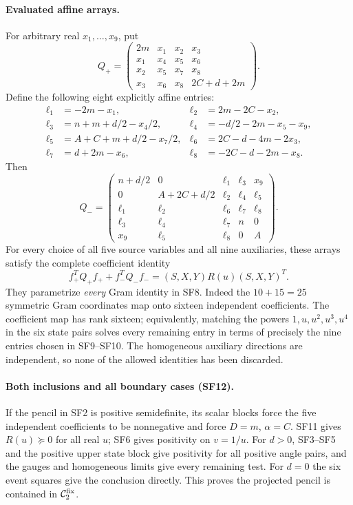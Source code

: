 \paragraph{Evaluated affine arrays.}
For arbitrary real $x_1,\ldots,x_9$, put
\[
Q_+=\begin{pmatrix}
2m&x_1&x_2&x_3\\
x_1&x_4&x_5&x_6\\
x_2&x_5&x_7&x_8\\
x_3&x_6&x_8&2C+d+2m
\end{pmatrix}.
\tag{SF9}
\]
Define the following eight explicitly affine entries:
\begin{align*}
\ell_1&=-2m-x_1,&\ell_2&=2m-2C-x_2,\\
\ell_3&=n+m+d/2-x_4/2,&\ell_4&=-d/2-2m-x_5-x_9,\\
\ell_5&=A+C+m+d/2-x_7/2,&\ell_6&=2C-d-4m-2x_3,\\
\ell_7&=d+2m-x_6,&\ell_8&=-2C-d-2m-x_8.
\end{align*}
Then
\[
Q_-=\begin{pmatrix}
n+d/2&0&\ell_1&\ell_3&x_9\\
0&A+2C+d/2&\ell_2&\ell_4&\ell_5\\
\ell_1&\ell_2&\ell_6&\ell_7&\ell_8\\
\ell_3&\ell_4&\ell_7&n&0\\
x_9&\ell_5&\ell_8&0&A
\end{pmatrix}.
\tag{SF10}
\]
For every choice of all five source variables and all nine auxiliaries,
these arrays satisfy the complete coefficient identity
\[
f_+^TQ_+f_++f_-^TQ_-f_-=(S,X,Y)R(u)(S,X,Y)^T.
\tag{SF11}
\]
They parametrize \emph{every} Gram identity in SF8.  Indeed the
$10+15=25$ symmetric Gram coordinates map onto sixteen independent
coefficients.  The coefficient map has rank sixteen; equivalently,
matching the powers $1,u,u^2,u^3,u^4$ in the six state pairs solves
every remaining entry in terms of precisely the nine entries chosen in
SF9--SF10.  The homogeneous auxiliary directions are independent,
so none of the allowed identities has been discarded.

\paragraph{Both inclusions and all boundary cases (SF12).}
If the pencil in SF2 is positive semidefinite, its scalar blocks force
the five independent coefficients to be nonnegative and force
$D=m$, $\alpha=C$.  SF11 gives $R(u)\succeq0$ for all real $u$;
SF6 gives positivity on $v=1/u$.  For $d>0$, SF3--SF5 and the
positive upper state block give positivity for all positive angle pairs,
and the gauges and homogeneous limits give every remaining test.
For $d=0$ the six event squares give the conclusion directly.
This proves the projected pencil is contained in $\mathcal C_2^{\rm fix}$.

